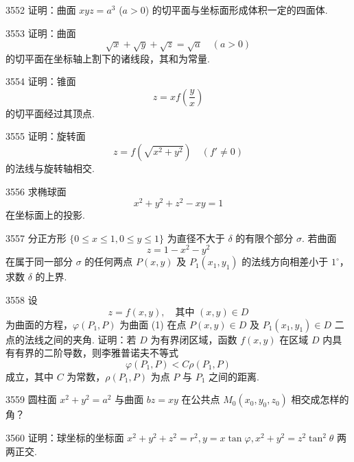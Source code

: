 \begin{prob}[M]{3552}
证明：曲面 $xyz = a^3$ ($a > 0$) 的切平面与坐标面形成体积一定的四面体.
\end{prob}

\begin{prob}[M]{3553}
证明：曲面
\[
\sqrt{x} + \sqrt{y} + \sqrt{z} = \sqrt{a} \quad (a > 0)
\]
的切平面在坐标轴上割下的诸线段，其和为常量.
\end{prob}

\begin{prob}[M]{3554}
证明：锥面
\[
z = x f\left(\frac{y}{x}\right)
\]
的切平面经过其顶点.
\end{prob}

\begin{prob}[M]{3555}
证明：旋转面
\[
z = f(\sqrt{x^2 + y^2}) \quad (f' \neq 0)
\]
的法线与旋转轴相交.
\end{prob}

\begin{prob}[M]{3556}
求椭球面
\[
x^2 + y^2 + z^2 - xy = 1
\]
在坐标面上的投影.
\end{prob}

\begin{prob}[M]{3557}
分正方形 $\{0 \leqslant x \leqslant 1, 0 \leqslant y \leqslant 1\}$ 为直径不大于 $\delta$ 的有限个部分 $\sigma$. 若曲面
\[
z = 1 - x^2 - y^2
\]
在属于同一部分 $\sigma$ 的任何两点 $P(x, y)$ 及 $P_1(x_1, y_1)$ 的法线方向相差小于 $1^\circ$，求数 $\delta$ 的上界.
\end{prob}

\begin{prob}[L]{3558}
设
\[
z = f(x, y), \quad \text{其中 } (x, y) \in D \tag{1}
\]
为曲面的方程，$\varphi(P_1, P)$ 为曲面 (1) 在点 $P(x, y) \in D$ 及 $P_1(x_1, y_1) \in D$ 二点的法线之间的夹角. 证明：若 $D$ 为有界闭区域，函数 $f(x, y)$ 在区域 $D$ 内具有有界的二阶导数，则李雅普诺夫不等式
\[
\varphi(P_1, P) < C\rho(P_1, P) \tag{2}
\]
成立，其中 $C$ 为常数，$\rho(P_1, P)$ 为点 $P$ 与 $P_1$ 之间的距离.
\end{prob}

\begin{prob}[M]{3559}
圆柱面 $x^2 + y^2 = a^2$ 与曲面 $bz = xy$ 在公共点 $M_0(x_0, y_0, z_0)$ 相交成怎样的角？
\end{prob}

\begin{prob}[M]{3560}
证明：球坐标的坐标面 $x^2 + y^2 + z^2 = r^2, y = x\tan\varphi, x^2 + y^2 = z^2\tan^2\theta$ 两两正交.
\end{prob}

